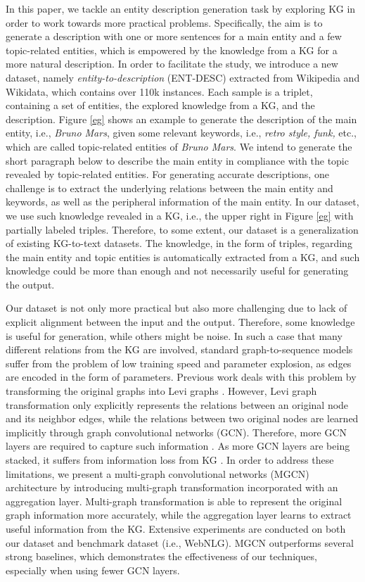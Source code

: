 \documentclass[11pt,a4paper]{article}
\begin{document}
In this paper, we tackle 
an entity description generation task by exploring KG
in order to work towards more practical problems. 
Specifically, the aim is to generate a description with one or more sentences for a main entity and a few topic-related entities, which is empowered by the knowledge from a KG for a more natural description. 
In order to facilitate the study, we introduce a new dataset, namely \textit{entity-to-description} (ENT-DESC) extracted from Wikipedia and Wikidata, which contains over 110k instances.
Each sample is a triplet, containing a set of entities, the explored knowledge from a KG, and the description. 
Figure \ref{eg} shows an example to generate the description of the main entity, i.e., \textit{Bruno Mars}, given some relevant keywords, i.e., \textit{retro style, funk,} etc., which are called topic-related entities of \textit{Bruno Mars}. 
We intend to generate the short paragraph below to describe the main entity in compliance with the topic revealed by topic-related entities.
For generating accurate descriptions, one challenge is to extract the underlying relations between the main entity and keywords, as well as the peripheral information of the main entity.
In our dataset, we use such knowledge revealed in a KG, i.e., the upper right in Figure \ref{eg} with partially labeled triples. 
Therefore, to some extent, our dataset is a generalization of existing KG-to-text datasets.
The knowledge, in the form of triples, regarding the main entity and topic entities is automatically extracted from a KG, and such knowledge could be more than enough and not necessarily useful for generating the output. 



Our dataset is not only more practical but also more challenging due to lack of explicit alignment between the input and the output. Therefore, some knowledge is useful for generation, while others might be noise.
In such a case that many different relations from the KG are involved, standard graph-to-sequence models suffer from the problem of low training speed and parameter explosion, as edges are encoded in the form of parameters.
Previous work deals with this problem by transforming the original graphs into Levi graphs \cite{beck2018graph}.
However, Levi graph transformation only explicitly represents the relations between an original node and its neighbor edges, while the relations between two original nodes are learned implicitly through graph convolutional networks (GCN). 
Therefore, more GCN layers are required to capture such information \cite{marcheggiani2018deep}.
As more GCN layers are being stacked, it suffers from information loss from KG \cite{abu2018n}.
In order to address these limitations, we present a multi-graph convolutional networks (MGCN) architecture by introducing multi-graph transformation incorporated with an aggregation layer.
Multi-graph transformation is able to represent the original graph information more accurately, while the aggregation layer learns to extract useful information from the KG.
Extensive experiments are conducted on both our dataset and benchmark dataset (i.e., WebNLG).
MGCN outperforms several strong baselines, which demonstrates the effectiveness of our techniques, especially when using fewer GCN layers.
\end{document}
